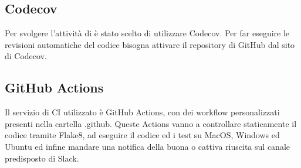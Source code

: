 \subsection{Codecov}

Per svolgere l'attività di  è stato scelto di utilizzare Codecov. Per far eseguire le revisioni automatiche del codice bisogna attivare il repository di GitHub dal sito di Codecov.

\subsection{GitHub Actions}
Il servizio di CI utilizzato è GitHub Actions, con dei workflow personalizzati presenti nella cartella .github. Queste Actions vanno a controllare staticamente il codice tramite Flake8, ad eseguire il codice ed i test su MacOS, Windows ed Ubuntu ed infine mandare una notifica della buona o cattiva riuscita sul canale predisposto di Slack.